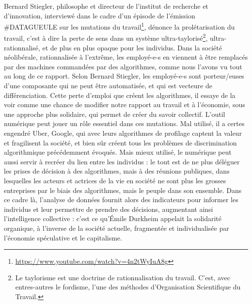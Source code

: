 \documentclass[a4paper,12pt]{report}
\begin{document}
Bernard Stiegler, philosophe et directeur de l'institut de recherche et d'innovation, interviewé dans le cadre d'un épisode de l'émission \#DATAGUEULE sur les mutations du travail\footnote{\url{https://www.youtube.com/watch?v=4n2tWyIuA8g}}, dénonce la prolétarisation du travail, c'est à dire la perte de sens dans un système ultra-taylorisé\footnote{Le taylorisme est une doctrine de rationnalisation du travail. C'est, avec entres-autres le fordisme, l'une des méthodes d'Organisation Scientifique du Travail.}, ultra-rationnalisé, et  de plus en plus opaque pour les individus. Dans la société néolibérale, rationnalisée à l'extrême, les employé-e-s en viennent à être remplacés par des machines commandées par des algorithmes, comme nous l'avons vu tout au long de ce rapport. Selon Bernard Stiegler, les employé-e-s sont porteur/euses d'une composante qui ne peut être automatisée, et qui est vecteure de différenciation. Cette perte d'emploi que créent les algorithmes, il essaye de la voir comme une chance de modifier notre rapport au travail et à l'économie, sous une approche plus solidaire, qui permet de créer du savoir collectif. L'outil numérique peut jouer un rôle essentiel dans ces mutations. Mal utilisé, il a certes engendré Uber, Google, qui avec leurs algorithmes de profilage captent la valeur et fragilisent la société, et bien sûr créent tous les problèmes de discrimination algorithmique précédemment évoqués. Mais mieux utilisé, le numérique peut aussi servir à recréer du lien entre les individus : le tout est de ne plus déléguer les prises de décision à des algorithmes, mais à des réunions publiques, dans lesquelles les acteurs et actrices de la vie en société ne sont plus les grosses entreprises par le biais des algorithmes, mais le peuple dans son ensemble. Dans ce cadre là, l'analyse de données fournit alors des indicateurs pour informer les individus et leur permettre de prendre des décisions, augmentant ainsi l'intelligence collective : c'est ce qu'Émile Durkheim appelait la solidarité organique, à l'inverse de la société actuelle, fragmentée et individualisée par l'économie spéculative et le capitalisme.
\end{document}
